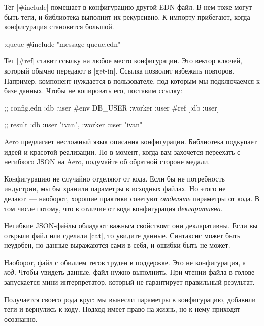 Тег \spverb|#include| помещает в конфигурацию другой EDN-файл. В нем тоже могут
быть теги, и библиотека выполнит их рекурсивно. К импорту прибегают, когда
конфигурация становится большой.

\begin{english}
  \begin{clojure}
{:queue #include "message-queue.edn"}
  \end{clojure}
\end{english}

Тег \spverb|#ref| ставит ссылку на любое место конфигурации. Это вектор ключей,
который обычно передают в \spverb|get-in|. Ссылка позволит избежать повторов.
Например, компонент нуждается в пользователе, под которым мы подключаемся к базе
данных. Чтобы не копировать его, поставим ссылку:

\begin{english}
  \begin{clojure}
;; config.edn
{:db {:user #env DB_USER}
 :worker {:user #ref [:db :user]}}

;; result
{:db {:user "ivan"}, :worker {:user "ivan"}}
  \end{clojure}
\end{english}

Aero предлагает несложный язык описания конфигурации. Библиотека подкупает идеей
и красотой реализации. Но в момент, когда вам захочется переехать с негибкого
JSON на Aero, подумайте об обратной стороне медали.


Конфигурацию не случайно отделяют от кода. Если бы не потребность индустрии, мы
бы хранили параметры в исходных файлах. Но этого не делают~--- наоборот, хорошие
практики советуют \emph{отделять} параметры от кода. В том числе потому, что в
отличие от кода конфигурация \emph{декларативна}.

Негибкие JSON-файлы обладают важным свойством: они декларативны. Если вы открыли
файл или сделали \spverb|cat|, то увидите данные. Синтаксис может быть неудобен,
но данные выражаются сами в себя, и ошибки быть не может.

Наоборот, файл с обилием тегов труден в поддержке. Это не конфигурация,
а \emph{код}. Чтобы увидеть данные, файл нужно выполнить. При чтении
файла в голове запускается мини-интерпретатор, который не гарантирует
правильный результат.

Получается своего рода круг: мы вынесли параметры в конфигурацию, добавили теги
и вернулись к коду. Подход имеет право на жизнь, но к нему приходят осознанно.

